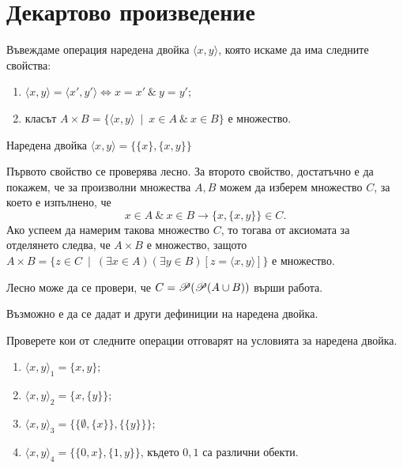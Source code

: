 
\section{Декартово произведение}
  Въвеждаме операция наредена двойка $\langle{x,y}\rangle$, която искаме да има следните свойства:
  \begin{enumerate}
  \item
    $\langle{x,y}\rangle = \langle{x',y'}\rangle \iff x = x' \ \&\ y = y'$;
  \item
    класът $A\times B = \{\langle{x,y}\rangle\ \mid\ x\in A\ \&\ x\in B\}$ е множество.
\end{enumerate}


\begin{dfn}[Куратовски]
  Наредена двойка $\langle{x,y}\rangle = \{\{x\},\{x,y\}\}$
\end{dfn}

Първото свойство се проверява лесно.
За второто свойство, достатъчно е да покажем, че за произволни множества $A,B$ можем да 
изберем множество $C$, за което е изпълнено, че
\[x\in A\ \&\ x\in B \rightarrow \{x,\{x,y\}\}\in C.\]
Ако успеем да намерим такова множество $C$, то тогава от аксиомата за отделянето следва, че $A\times B$
е множество, защото $A\times B = \{ z\in C\ \mid\ (\exists x\in A)(\exists y\in B)[z = \langle{x,y}\rangle]\}$ е множество.

Лесно може да се провери, че $C = \mathscr{P}(\mathscr{P}(A\cup B))$ върши работа.

Възможно е да се дадат и други дефиниции на наредена двойка.
\begin{problem}
  Проверете кои от следните операции отговарят на условията за наредена двойка.
  \begin{enumerate}
  \item
    $\langle{x,y}\rangle_{1} = \{x,y\}$;
  \item
    $\langle{x,y}\rangle_{2} = \{x,\{y\}\}$;
  \item
    $\langle{x,y}\rangle_{3} = \{\{\emptyset,\{x\}\},\{\{y\}\}\}$;
  \item
    $\langle{x,y}\rangle_{4} = \{\{0,x\},\{1,y\}\}$, 
    където $0,1$ са различни обекти.
\end{enumerate}
\end{problem}



